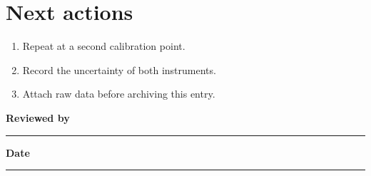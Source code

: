 \documentclass[11pt,a4paper]{article}
\newcommand{\linefield}[2]{\textbf{#1}\ \rule{#2}{.4pt}}
\begin{document}
\section*{Next actions}
\begin{enumerate}[leftmargin=8mm,itemsep=2pt]
  \item Repeat at a second calibration point.
  \item Record the uncertainty of both instruments.
  \item Attach raw data before archiving this entry.
\end{enumerate}
\noindent\linefield{Reviewed by}{48mm}\hfill\linefield{Date}{25mm}
\end{document}

